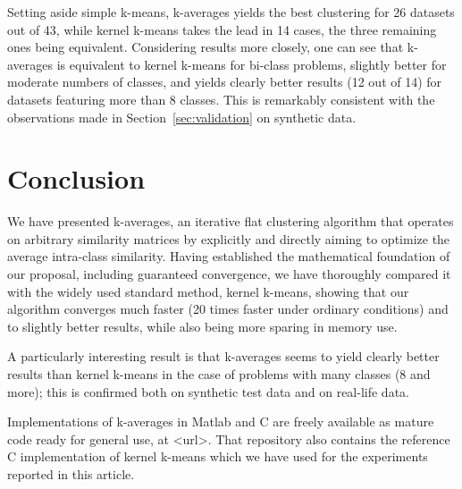 \documentclass[a4paper,twoside]{article}
\begin{document}
Setting aside simple k-means, k-averages yields the best clustering for 26 datasets out of 43, while kernel k-means takes the lead in 14 cases, the three remaining ones being equivalent. Considering results more closely, one can see that k-averages is equivalent to kernel k-means for bi-class problems, slightly better for moderate numbers of classes, and yields clearly better results (12 out of 14) for datasets featuring more than 8 classes. This is remarkably consistent with the observations made in Section~\ref{sec:validation} on synthetic data.

\section{Conclusion}

We have presented k-averages, an iterative flat clustering algorithm that operates on arbitrary similarity matrices by explicitly and directly aiming to optimize the average intra-class similarity. Having established the mathematical foundation of our proposal, including guaranteed convergence, we have thoroughly compared it with the widely used standard method, kernel k-means, showing that our algorithm converges much faster (20 times faster under ordinary conditions) and to slightly better results, while also being more sparing in memory use.

A particularly interesting result is that k-averages seems to yield clearly better results than kernel k-means in the case of problems with many classes (8 and more); this is confirmed both on synthetic test data and on real-life data.

Implementations of k-averages in Matlab and C are freely available as mature code ready for general use, at <url>. That repository also contains the reference C implementation of kernel k-means which we have used for the experiments reported in this article.


\end{document}
